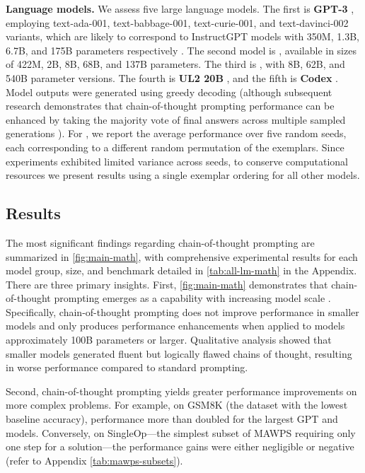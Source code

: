 \textbf{Language models.} We assess five large language models. The first is \textbf{GPT-3} \citep{brown2020language}, employing text-ada-001, text-babbage-001, text-curie-001, and text-davinci-002 variants, which are likely to correspond to InstructGPT models with 350M, 1.3B, 6.7B, and 175B parameters respectively \citep{ouyang2022training}. The second model is \textbf{\lamda{}} \citep{thoppilan2022lamda}, available in sizes of 422M, 2B, 8B, 68B, and 137B parameters. The third is \textbf{\palm{}}, with 8B, 62B, and 540B parameter versions. The fourth is \textbf{UL2 20B} \citep{tay2022unifying}, and the fifth is \textbf{Codex} \citep[][code-davinci-002 in the OpenAI API]{chen2021evaluating}. Model outputs were generated using greedy decoding (although subsequent research demonstrates that chain-of-thought prompting performance can be enhanced by taking the majority vote of final answers across multiple sampled generations \citep{wang2022self}). For \lamda{}, we report the average performance over five random seeds, each corresponding to a different random permutation of the exemplars. Since \lamda{} experiments exhibited limited variance across seeds, to conserve computational resources we present results using a single exemplar ordering for all other models.

\subsection{Results}  
The most significant findings regarding chain-of-thought prompting are summarized in \cref{fig:main-math}, with comprehensive experimental results for each model group, size, and benchmark detailed in \cref{tab:all-lm-math} in the Appendix. There are three primary insights. First, \cref{fig:main-math} demonstrates that chain-of-thought prompting emerges as a capability with increasing model scale \citep{wei2022emergent}. Specifically, chain-of-thought prompting does not improve performance in smaller models and only produces performance enhancements when applied to models approximately 100B parameters or larger. Qualitative analysis showed that smaller models generated fluent but logically flawed chains of thought, resulting in worse performance compared to standard prompting.

  
Second, chain-of-thought prompting yields greater performance improvements on more complex problems. For example, on GSM8K (the dataset with the lowest baseline accuracy), performance more than doubled for the largest GPT and \palm{} models. Conversely, on SingleOp—the simplest subset of MAWPS requiring only one step for a solution—the performance gains were either negligible or negative (refer to Appendix \cref{tab:mawps-subsets}).

